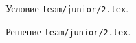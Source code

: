 \problem{}
Условие \texttt{team/junior/2.tex}.

\solution Решение \texttt{team/junior/2.tex}.
\endproblem
